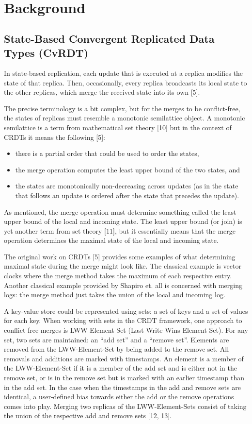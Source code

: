 \documentclass[11pt]{article}
\begin{document}
\newpage
\section{Background}
\subsection{State-Based Convergent Replicated Data Types (CvRDT)}
In state-based replication, each update that is executed at a replica modifies the state of that replica. Then, occasionally, every replica broadcasts its local state to the other replicas, which merge the received state into its own [5].

The precise terminology is a bit complex, but for the merges to be conflict-free, the states of replicas must resemble a monotonic semilattice object. A monotonic semilattice is a term from mathematical set theory [10] but in the context of CRDTs it means the following [5]:
\begin{itemize}
 \item there is a partial order that could be used to order the states,
 \item the merge operation computes the least upper bound of the two states, and
 \item the states are monotonically non-decreasing across updates (as in the state that follows an update is ordered after the state that precedes the update).
\end{itemize}

As mentioned, the merge operation must determine something called the least upper bound of the local and incoming state. The least upper bound (or join) is yet another term from set theory [11], but it essentially means that the merge operation determines the maximal state of the local and incoming state.

The original work on CRDTs [5] provides some examples of what determining maximal state during the merge might look like. The classical example is vector clocks where the merge method takes the maximum of each respective entry. Another classical example provided by Shapiro et. all is concerned with merging logs: the merge method just takes the union of the local and incoming log.

A key-value store could be represented using sets: a set of keys and a set of values for each key. When working with sets in the CRDT framework, one approach to conflict-free merges is LWW-Element-Set (Last-Write-Wins-Element-Set). For any set, two sets are maintained: an “add set” and a “remove set”. Elements are removed from the LWW-Element-Set by being added to the remove set. All removals and additions are marked with timestamps. An element is a member of the LWW-Element-Set if it is a member of the add set and is either not in the remove set, or is in the remove set but is marked with an earlier timestamp than in the add set. In the case when the timestamps in the add and remove sets are identical, a user-defined bias towards either the add or the remove operations comes into play. Merging two replicas of the LWW-Element-Sets consist of taking the union of the respective add and remove sets [12, 13].
\end{document}

